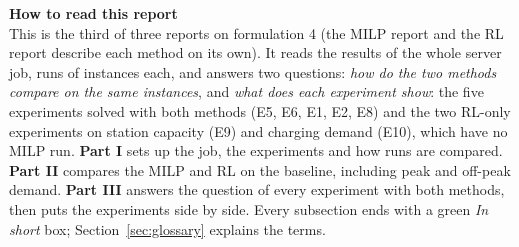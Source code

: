 
\usepackage{adjustbox}

\newcommand{\Rt}{RL$_{\mathrm{rt}}$}




\begin{keybox}
{\color{headblue}\textbf{How to read this report}}\\
This is the third of three reports on formulation 4 (the MILP report and the RL report describe each method on its own). It reads the results of the whole server job, \NRuns{} runs of \NInst{} instances each, and answers two questions: \emph{how do the two methods compare on the same instances}, and \emph{what does each experiment show}: the five experiments solved with both methods (E5, E6, E1, E2, E8) and the two RL-only experiments on station capacity (E9) and charging demand (E10), which have no MILP run. \textbf{Part I} sets up the job, the experiments and how runs are compared. \textbf{Part II} compares the MILP and RL on the baseline, including peak and off-peak demand. \textbf{Part III} answers the question of every experiment with both methods, then puts the experiments side by side. Every subsection ends with a green \emph{In short} box; Section~\ref{sec:glossary} explains the terms.
\end{keybox}

